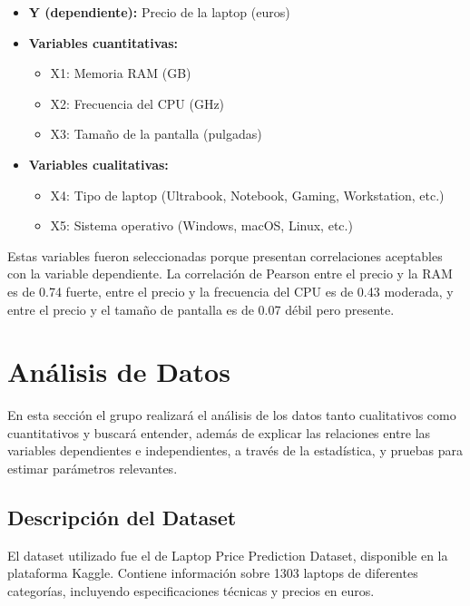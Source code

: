 \documentclass[12pt,a4paper]{article}
\begin{document}
\begin{itemize}[leftmargin=2cm]
    \item \textbf{Y (dependiente):} Precio de la laptop (euros)
    
    \item \textbf{Variables cuantitativas:}
    \begin{itemize}
        \item X1: Memoria RAM (GB)
        \item X2: Frecuencia del CPU (GHz)
        \item X3: Tamaño de la pantalla (pulgadas)
    \end{itemize}
    
    \item \textbf{Variables cualitativas:}
    \begin{itemize}
        \item X4: Tipo de laptop (Ultrabook, Notebook, Gaming, Workstation, etc.)
        \item X5: Sistema operativo (Windows, macOS, Linux, etc.)
    \end{itemize}
\end{itemize}

Estas variables fueron seleccionadas porque presentan correlaciones aceptables con la variable dependiente. La correlación de Pearson entre el precio y la RAM es de 0.74 fuerte, entre el precio y la frecuencia del CPU es de 0.43 moderada, y entre el precio y el tamaño de pantalla es de 0.07 débil pero presente.


\section{Análisis de Datos}
En esta sección el grupo realizará el análisis de los datos tanto cualitativos como cuantitativos y buscará entender, además de explicar las relaciones entre las variables dependientes e independientes, a través de la estadística, y pruebas para estimar parámetros relevantes.

\subsection{Descripción del Dataset}

El dataset utilizado fue el de Laptop Price Prediction Dataset, disponible en la plataforma Kaggle. Contiene información sobre 1303 laptops de diferentes categorías, incluyendo especificaciones técnicas y precios en euros.
\end{document}
